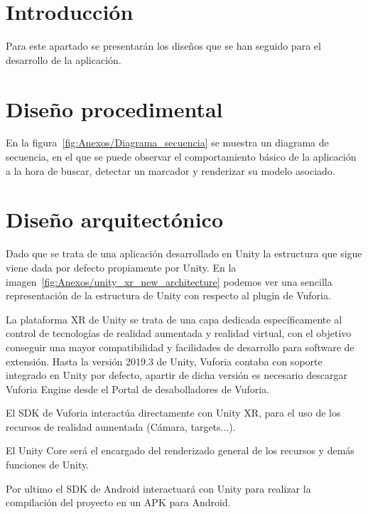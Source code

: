 
\section{Introducción}
 Para este apartado se presentarán los diseños que se han seguido para el desarrollo de la aplicación.
 

\section{Diseño procedimental}
En la figura~\ref{fig:Anexos/Diagrama_secuencia} se muestra un diagrama de secuencia, en el que se puede observar el comportamiento básico de la aplicación a la hora de buscar, detectar un marcador y renderizar su modelo asociado. 



\section{Diseño arquitectónico}


Dado que se trata de una aplicación desarrollado en Unity la estructura que sigue viene dada por defecto propiamente por Unity. En la imagen~\ref{fig:Anexos/unity_xr_new_architecture} podemos ver una sencilla representación de la estructura de Unity con respecto al plugin de Vuforia. 

La plataforma XR de Unity se trata de una capa dedicada específicamente al control de tecnologías de realidad aumentada y realidad virtual, con el objetivo conseguir una mayor compatibilidad y facilidades de desarrollo para software de extensión. Hasta la versión 2019.3 de Unity, Vuforia contaba con soporte integrado en Unity por defecto, apartir de dicha versión es necesario descargar Vuforia Engine desde el Portal de desabolladores de Vuforia. 

 
El SDK de Vuforia interactúa directamente con Unity XR, para el uso de los recursos de realidad aumentada (Cámara, targets...). 

El Unity Core será el encargado del renderizado general de los recursos y demás funciones de Unity.

Por ultimo el SDK de Android interactuará con Unity para realizar la compilación del proyecto en un APK para Android.





